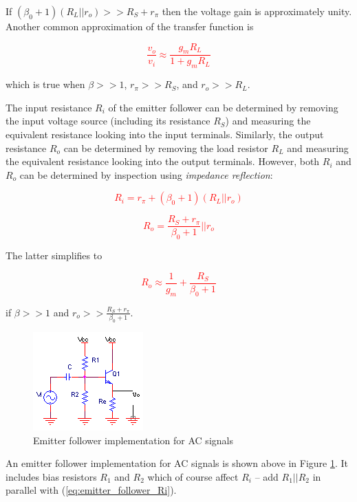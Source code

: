 \noindent If $(\beta_{0} + 1)(R_{L}||r_{o}) >> R_{S}+r_{\pi}$ then the voltage gain is approximately unity. Another common approximation of the transfer function is

\textcolor{red}{
\begin{equation}
\frac{v_{o}}{v_{i}} \approx \frac{g_{m}R_{L}}{1+g_{m}R_{L}}
\label{eq:emitter_follower_approx}
\end{equation}
}

\noindent which is true when $\beta >> 1$, $r_{\pi} >> R_{S}$, and $r_{o} >> R_{L}$.
\par
The input resistance $R_{i}$ of the emitter follower can be determined by removing the input voltage source (including its resistance $R_{S}$) and measuring the equivalent resistance looking into the input terminals. Similarly, the output resistance $R_{o}$ can be determined by removing the load resistor $R_{L}$ and measuring the equivalent resistance looking into the output terminals. However, both $R_{i}$ and $R_{o}$ can be determined by inspection using \textit{impedance reflection}:

\textcolor{red}{
\begin{equation}
R_{i} = r_{\pi} + (\beta_{0} + 1)(R_{L}||r_{o})
\label{eq:emitter_follower_Ri}
\end{equation}
}

\textcolor{red}{
\begin{equation}
R_{o} = \frac{R_{S}+r_{\pi}}{\beta_{0} + 1}||r_{o}
\label{eq:emitter_follower_Ro}
\end{equation}
}

\noindent The latter simplifies to

\textcolor{red}{
\begin{equation}
R_{o} \approx \frac{1}{g_{m}} + \frac{R_{S}}{\beta_{0} + 1}
\label{eq:emitter_follower_Ro_approx}
\end{equation}
}

\noindent if $\beta >> 1$ and $r_{o} >> \frac{R_{S}+r_{\pi}}{\beta_{0} + 1}$.
\newpage
\begin{figure}[h]
	\centering
		\includegraphics{schematics/emitterfollower.PNG}
	\caption{Emitter follower implementation for AC signals}
	\label{fig:emitterfollowerAC}
\end{figure}
\par
An emitter follower implementation for AC signals is shown above in Figure \ref{fig:emitterfollowerAC}. It includes bias resistors $R_{1}$ and $R_{2}$ which of course affect $R_{i}$ -- add $R_{1}||R_{2}$ in parallel with (\ref{eq:emitter_follower_Ri}).

